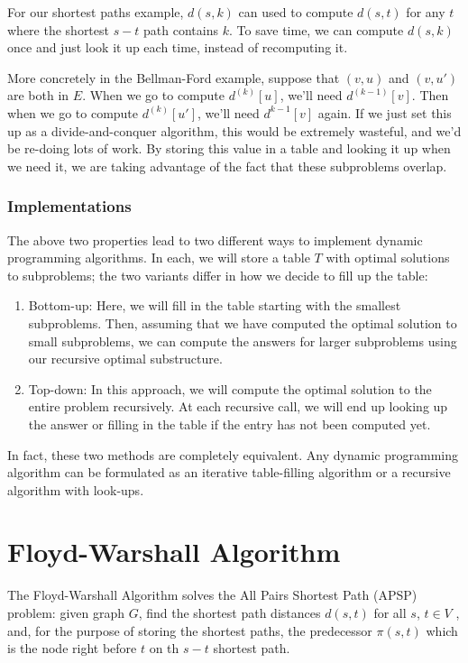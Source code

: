 \documentclass [12pt]{article}
\theoremstyle{definition}
\begin{document}
For our shortest paths example, $d(s, k)$ can used to compute $d(s, t)$ for any $t$ where the shortest $s - t$ path contains $k$. To save time, we can compute $d(s, k)$ once and just look it up each time, instead of recomputing it.

More concretely in the Bellman-Ford example, suppose that $(v, u)$ and $(v, u' )$ are both in $E$. When we go to compute $d^{(k)}[u]$, we'll need $d^{(k-1)}[v ]$. Then when we go to compute $d^{(k)}[u ' ]$, we'll need $d^{k-1}[v ]$ again. If we just set this up as a divide-and-conquer algorithm, this would be extremely wasteful, and we'd be re-doing lots of work. By storing this value in a table and looking it up when we need it, we are taking advantage of the fact that these subproblems overlap.


\subsubsection{Implementations} 

The above two properties lead to two different ways to implement dynamic programming algorithms. In each, we will store a table $T$ with optimal solutions to subproblems; the two variants differ in how we decide to fill up the table: 

\begin{enumerate}
  \item Bottom-up: Here, we will fill in the table starting with the smallest subproblems. Then, assuming that we have computed the optimal solution to small subproblems, we can compute the answers for larger subproblems using our recursive optimal substructure.
  \item Top-down: In this approach, we will compute the optimal solution to the entire problem recursively. At each recursive call, we will end up looking up the answer or filling in the table if the entry has not been computed yet.
\end{enumerate}
In fact, these two methods are completely equivalent. Any dynamic programming algorithm can be formulated as an iterative table-filling algorithm or a recursive algorithm with look-ups.

\section{Floyd-Warshall Algorithm} 

The Floyd-Warshall Algorithm solves the All Pairs Shortest Path (APSP) problem: given  graph $G$, find the shortest path distances $d(s, t)$ for all $s$, $t \in V$ , and, for the purpose of storing the shortest paths, the predecessor $\pi(s, t)$ which is the node right before $t$ on th $s-t$ shortest path.
\end{document}
